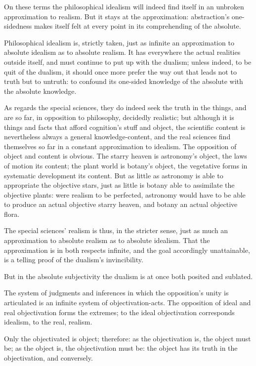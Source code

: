 \documentclass[12pt]{book}
\begin{document}
On these terms the philosophical idealism will indeed find itself in
an unbroken approximation to realism. But it stays at the
approximation: abstraction's one-sidedness makes itself felt at
every point in its comprehending of the absolute.

Philosophical idealism is, strictly taken, just as infinite an
approximation to absolute idealism as to absolute realism. It has
everywhere the actual realities outside itself, and must continue to
put up with the dualism; unless indeed, to be quit of the dualism,
it should once more
prefer the way out that leads not to truth but to untruth: to
confound its one-sided knowledge of the absolute with the absolute
knowledge.

As regards the special sciences, they do indeed seek the truth in
the things, and are so far, in opposition to philosophy, decidedly
realistic; but although it is things and facts that afford
cognition's stuff and object, the scientific content is nevertheless
always a general knowledge-content, and the real sciences find
themselves so far in a constant approximation to idealism. The
opposition of object and content is obvious. The starry heaven is
astronomy's object, the laws of motion its content; the plant world
is botany's object, the vegetative forms in systematic development
its content. But as little as astronomy is able to appropriate the
objective stars, just as little is botany able to assimilate the
objective plants: were realism to be perfected, astronomy would have
to be able to produce an actual objective starry heaven, and botany
an actual objective flora.

The special sciences' realism is thus, in the stricter sense, just
as much an approximation to absolute realism as to absolute
idealism. That the approximation is in both respects infinite, and
the goal accordingly unattainable, is a telling proof of the
dualism's invincibility.

But in the absolute subjectivity the dualism is at once both posited
and sublated.

The system of judgments and inferences in which the opposition's
unity is articulated is an infinite system of objectivation-acts.
The opposition of ideal and real objectivation forms the extremes;
to the ideal objectivation corresponds idealism, to the real,
realism.

Only the objectivated is object; therefore: as the objectivation is,
the object must be; as the object is, the
objectivation must be: the object has its truth in the
objectivation, and conversely.
\end{document}
